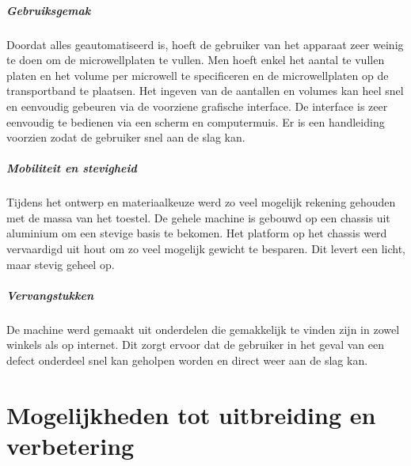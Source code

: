 \documentclass[a4paper,twoside,kulak]{kulakreport} %
\begin{document}
\paragraph{Gebruiksgemak}

Doordat alles geautomatiseerd is, hoeft de gebruiker van het apparaat zeer weinig te doen om de microwellplaten te vullen. Men hoeft enkel het aantal te vullen platen en het volume per microwell te specificeren en de microwellplaten op de transportband te plaatsen. Het ingeven van de aantallen en volumes kan heel snel en eenvoudig gebeuren via de voorziene grafische interface. De interface is zeer eenvoudig te bedienen via een scherm en computermuis. Er is een handleiding voorzien zodat de gebruiker snel aan de slag kan.

\paragraph{Mobiliteit en stevigheid}

Tijdens het ontwerp en materiaalkeuze werd zo veel mogelijk rekening gehouden met de massa van het toestel. De gehele machine is gebouwd op een chassis uit aluminium om een stevige basis te bekomen. Het platform op het chassis werd vervaardigd uit hout om zo veel mogelijk gewicht te besparen. Dit levert een licht, maar stevig geheel op. 

\paragraph{Vervangstukken}

De machine werd gemaakt uit onderdelen die gemakkelijk te vinden zijn in zowel winkels als op internet. Dit zorgt ervoor dat de gebruiker in het geval van een defect onderdeel snel kan geholpen worden en direct weer aan de slag kan.

\chapter{Mogelijkheden tot uitbreiding en verbetering}
\end{document}
